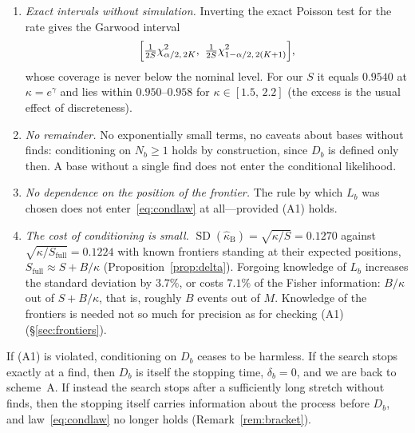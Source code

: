 \documentclass[11pt,a4paper]{article}
\theoremstyle{plain}
\theoremstyle{remark}
\newcommand{\eg}{e^{\gamma}}
\begin{document}
\begin{enumerate}
\item \emph{Exact intervals without simulation.} Inverting the exact Poisson
test for the rate gives the Garwood interval~\cite{garwood1936}
\begin{equation}\label{eq:garwood}
\Bigl[\tfrac{1}{2S}\chi^2_{\alpha/2,\,2K},\ \tfrac{1}{2S}\chi^2_{1-\alpha/2,\,2(K+1)}\Bigr],
\end{equation}
whose coverage is never below the nominal level. For our $S$ it equals $0.9540$ at
$\kappa=\eg$ and lies within $0.950$--$0.958$ for $\kappa\in[1.5,\,2.2]$ (the
excess is the usual effect of discreteness).
\item \emph{No remainder.} No exponentially small terms, no caveats about bases
without finds: conditioning on $N_b\ge1$ holds by construction, since $D_b$ is
defined only then. A base without a single find does not enter the conditional
likelihood.
\item \emph{No dependence on the position of the frontier.} The rule by which
$L_b$ was chosen does not enter~\eqref{eq:condlaw} at all---provided (A1) holds.
\item \emph{The cost of conditioning is small.} $\operatorname{SD}(\hat\kappa_{\mathrm B})
=\sqrt{\kappa/S}=0.1270$ against $\sqrt{\kappa/S_{\mathrm{full}}}=0.1224$ with
known frontiers standing at their expected positions,
$S_{\mathrm{full}}\approx S+B/\kappa$ (Proposition~\ref{prop:delta}). Forgoing
knowledge of $L_b$ increases the standard deviation by $3.7\%$, or costs $7.1\%$ of
the Fisher information: $B/\kappa$ out of $S+B/\kappa$, that is, roughly $B$ events
out of $M$. Knowledge of the frontiers is needed not so much for precision as for
checking (A1) (\S\ref{sec:frontiers}).
\end{enumerate}

\noindent If (A1) is violated, conditioning on $D_b$ ceases to be harmless. If
the search stops exactly at a find, then $D_b$ is itself the stopping time,
$\delta_b=0$, and we are back to scheme~A. If instead the search stops after a
sufficiently long stretch without finds, then the stopping itself carries
information about the process before $D_b$, and law~\eqref{eq:condlaw} no longer
holds (Remark~\ref{rem:bracket}).
\end{document}
